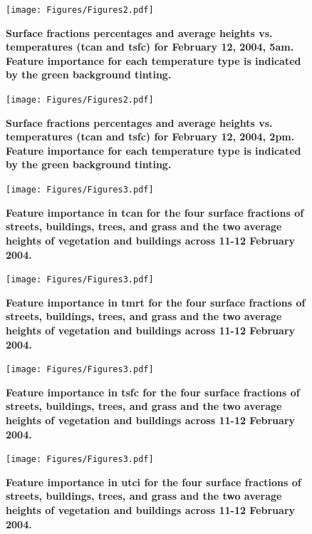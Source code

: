 \documentclass[final,3p,times,authoryear]{elsarticle}
\begin{document}
\begin{figure}
\centering
\texttt{[image: Figures/Figures2.pdf]}
\caption{\bf Surface fractions percentages and average heights vs. temperatures (\gls{tcan} and \gls{tsfc}) for February 12, 2004, 5am. Feature importance for each temperature type is indicated by the green background tinting.}
 \label{fig:box5a}
\end{figure} 

\begin{figure}
\centering
\texttt{[image: Figures/Figures2.pdf]}
\caption{\bf Surface fractions percentages and average heights vs. temperatures (\gls{tcan} and \gls{tsfc}) for February 12, 2004, 2pm. Feature importance for each temperature type is indicated by the green background tinting.}
 \label{fig:box14a}
\end{figure} 



\begin{figure}
\centering
\texttt{[image: Figures/Figures3.pdf]}
\caption{\bf Feature importance in \gls{tcan} for the four surface fractions of streets, buildings, trees, and grass and the two average heights of vegetation and buildings across 11-12 February 2004. }
 \label{fig:featimpttcan}
\end{figure}

\begin{figure}
\centering
\texttt{[image: Figures/Figures3.pdf]}
\caption{\bf Feature importance in \gls{tmrt} for the four surface fractions of streets, buildings, trees, and grass and the two average heights of vegetation and buildings across 11-12 February 2004. }
 \label{fig:featimpttmrt}
\end{figure}

\begin{figure}
\centering
\texttt{[image: Figures/Figures3.pdf]}
\caption{\bf Feature importance in \gls{tsfc} for the four surface fractions of streets, buildings, trees, and grass and the two average heights of vegetation and buildings across 11-12 February 2004. }
 \label{fig:featimpttsfc}
\end{figure}

\begin{figure}
\centering
\texttt{[image: Figures/Figures3.pdf]}
\caption{\bf Feature importance in \gls{utci} for the four surface fractions of streets, buildings, trees, and grass and the two average heights of vegetation and buildings across 11-12 February 2004. }
 \label{fig:featimptutci}
\end{figure}
\end{document}
